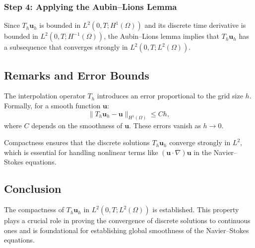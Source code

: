 \documentclass[12pt]{article}
\begin{document}
\subsubsection{Step 4: Applying the Aubin--Lions Lemma}

Since $T_h \mathbf{u}_h$ is bounded in $L^2(0,T; H^1(\Omega))$ and its discrete time derivative is bounded in $L^2(0,T; H^{-1}(\Omega))$, the Aubin--Lions lemma implies that $T_h \mathbf{u}_h$ has a subsequence that converges strongly in $L^2(0,T; L^2(\Omega))$.

\subsection{Remarks and Error Bounds}

\begin{remark}
The interpolation operator $T_h$ introduces an error proportional to the grid size $h$. Formally, for a smooth function $\mathbf{u}$:
\begin{equation}
\|T_h \mathbf{u}_h - \mathbf{u}\|_{H^1(\Omega)} \leq Ch,
\end{equation}
where $C$ depends on the smoothness of $\mathbf{u}$. These errors vanish as $h \to 0$.
\end{remark}

\begin{remark}
Compactness ensures that the discrete solutions $T_h \mathbf{u}_h$ converge strongly in $L^2$, which is essential for handling nonlinear terms like $(\mathbf{u} \cdot \nabla) \mathbf{u}$ in the Navier--Stokes equations.
\end{remark}

\subsection{Conclusion}

The compactness of $T_h \mathbf{u}_h$ in $L^2(0,T; L^2(\Omega))$ is established. This property plays a crucial role in proving the convergence of discrete solutions to continuous ones and is foundational for establishing global smoothness of the Navier--Stokes equations.
\end{document}
